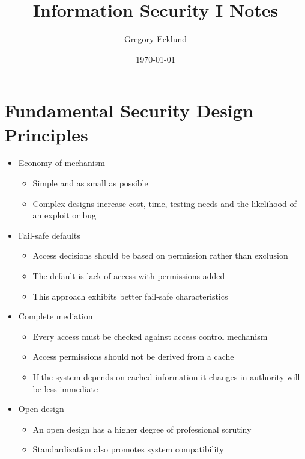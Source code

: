 \documentclass[12pt]{article}
\title{Information Security I Notes}
\author{Gregory Ecklund}
\date{\today}
\begin{document}
    \maketitle
    \newpage

    \section{Fundamental Security Design Principles}
        \begin{itemize}
            \item Economy of mechanism
                \begin{itemize}
                    \item Simple and as small as possible
                    \item Complex designs increase cost, time, testing needs and the likelihood
                    of an exploit or bug
                \end{itemize}
            \item Fail-safe defaults
                \begin{itemize}
                    \item Access decisions should be based on permission rather than exclusion
                    \item The default is lack of access with permissions added
                    \item This approach exhibits better fail-safe characteristics
                \end{itemize}
            \item Complete mediation
                \begin{itemize}
                    \item Every access must be checked against access control mechanism
                    \item Access permissions should not be derived from a cache
                    \item If the system depends on cached information it changes in authority will
                    be less immediate
                \end{itemize}
            \item Open design
                \begin{itemize}
                    \item An open design has a higher degree of professional scrutiny
                    \item Standardization also promotes system compatibility

\end{itemize}
\end{itemize}
\end{document}
